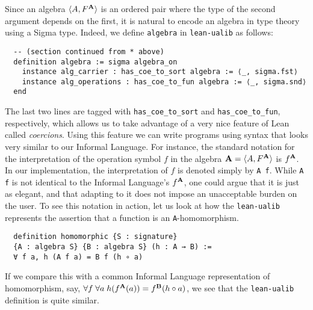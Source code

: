 \documentclass[12pt]{amsart}  %
\begin{document}
Since an algebra $\langle A, F^{\mathbf{A}}\rangle$ is an ordered pair where the type of the second argument depends on the first, it is natural to encode an algebra in type theory using a Sigma type. 
Indeed, we define \lstinline{algebra} in \lstinline{lean-ualib} as follows:
\begin{lstlisting}
  -- (section continued from * above)
  definition algebra := sigma algebra_on
    instance alg_carrier : has_coe_to_sort algebra := ⟨_, sigma.fst⟩
    instance alg_operations : has_coe_to_fun algebra := ⟨_, sigma.snd⟩
  end
\end{lstlisting}  
The last two lines are tagged with \lstinline{has_coe_to_sort} and \lstinline{has_coe_to_fun}, respectively, which allows us to take advantage of a very nice feature of Lean called \emph{coercions}. Using this feature we can write programs using syntax that looks very similar to our Informal Language. For instance, the standard notation for the interpretation of the operation symbol $f$ in the algebra $\mathbf{A} = \langle A, F^{\mathbf{A}}\rangle$ is $f^{\mathbf{A}}$.  In our implementation, the interpretation of $f$ is denoted simply by \lstinline{A f}. While \lstinline{A f} is not identical to
the Informal Language's $f^{\mathbf{A}}$, one could argue that it is just as elegant, and that adapting to it does not impose an unacceptable burden on the user. 
To see this notation in action, let us look at how the \lstinline{lean-ualib} represents the assertion that a function is an \lstinline{A}-homomorphism.
\begin{lstlisting}
  definition homomorphic {S : signature} 
  {A : algebra S} {B : algebra S} (h : A → B) := 
  ∀ f a, h (A f a) = B f (h ∘ a)
\end{lstlisting}
If we compare this with a common Informal Language representation of homomorphism, say,
$\forall f \; \forall a \; h (f^{\mathbf{A}} (a)) = f^{\mathbf{B}} (h \circ a)$,
we see that the \lstinline{lean-ualib} definition is quite similar.
\end{document}
